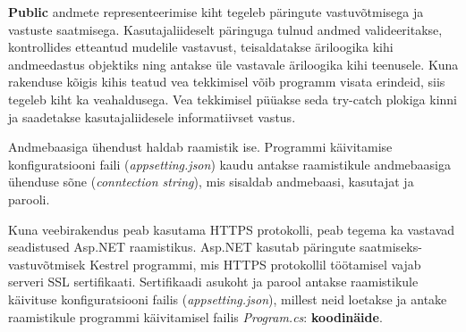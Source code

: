 \textbf{Public} andmete representeerimise kiht tegeleb päringute vastuvõtmisega ja vastuste saatmisega. Kasutajaliideselt päringuga 
tulnud andmed valideeritakse, kontrollides etteantud mudelile vastavust, teisaldatakse äriloogika kihi andmeedastus objektiks
ning antakse üle vastavale äriloogika kihi teenusele. Kuna rakenduse kõigis kihis teatud vea tekkimisel võib programm visata erindeid,
siis tegeleb kiht ka veahaldusega. Vea tekkimisel püüakse seda try-catch plokiga kinni ja saadetakse kasutajaliidesele informatiivset
vastus.

Andmebaasiga ühendust haldab raamistik ise. Programmi käivitamise konfiguratsiooni faili (\textit{appsetting.json}) kaudu
antakse raamistikule andmebaasiga ühenduse sõne (\textit{conntection string}), mis sisaldab andmebaasi, kasutajat ja parooli.

Kuna veebirakendus peab kasutama HTTPS protokolli, peab tegema ka vastavad seadistused Asp.NET raamistikus. Asp.NET kasutab päringute
saatmiseks-vastuvõtmisek Kestrel programmi, mis HTTPS protokollil töötamisel vajab serveri SSL sertifikaati. Sertifikaadi
asukoht ja parool antakse raamistikule käivituse konfiguratsiooni failis (\textit{appsetting.json}), millest neid loetakse
ja antake raamistikule programmi käivitamisel failis \textit{Program.cs}: \textbf{koodinäide}.





